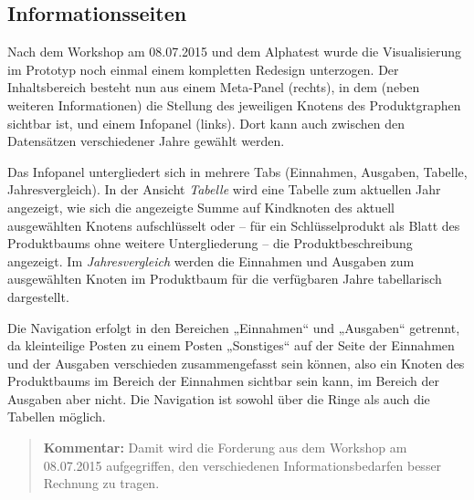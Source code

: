 \documentclass[11pt,a4paper,twoside]{article}
\newcommand{\kommentar}[1]{\begin{quote}\textbf{Kommentar:} #1 \end{quote}}
\begin{document}
\subsection{Informationsseiten}

Nach dem Workshop am 08.07.2015 und dem Alphatest wurde die Visualisierung im
Prototyp noch einmal einem kompletten Redesign unterzogen. Der Inhaltsbereich
besteht nun aus einem Meta-Panel (rechts), in dem (neben weiteren
Informationen) die Stellung des jeweiligen Knotens des Produktgraphen sichtbar
ist, und einem Infopanel (links).  Dort kann auch zwischen den Datensätzen
verschiedener Jahre gewählt werden. 

Das Infopanel untergliedert sich in mehrere Tabs (Einnahmen, Ausgaben, Tabelle,
Jahresvergleich). In der Ansicht \emph{Tabelle} wird eine Tabelle zum aktuellen
Jahr angezeigt, wie sich die angezeigte Summe auf Kindknoten des aktuell
ausgewählten Knotens aufschlüsselt oder -- für ein Schlüsselprodukt als Blatt
des Produktbaums ohne weitere Untergliederung -- die Produktbeschreibung
angezeigt. Im \emph{Jahresvergleich} werden die Einnahmen und Ausgaben zum
ausgewählten Knoten im Produktbaum für die verfügbaren Jahre tabellarisch
dargestellt.

Die Navigation erfolgt in den Bereichen „Einnahmen“ und „Ausgaben“ getrennt, da
kleinteilige Posten zu einem Posten „Sonstiges“ auf der Seite der Einnahmen und
der Ausgaben verschieden zusammengefasst sein können, also ein Knoten des
Produktbaums im Bereich der Einnahmen sichtbar sein kann, im Bereich der
Ausgaben aber nicht.  Die Navigation ist sowohl über die Ringe als auch die
Tabellen möglich.

\kommentar{Damit wird die Forderung aus dem Workshop am 08.07.2015
  aufgegriffen, den verschiedenen Informationsbedarfen besser Rechnung zu
  tragen.}
\end{document}
